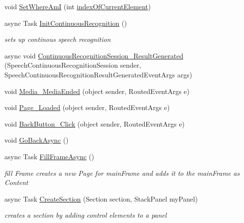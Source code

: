 \begin{DoxyCompactItemize}
void \mbox{\hyperlink{class_listen_to_me_1_1_main_page_ad9bc9fb81f3bfa4ccdee54d0f36503f1}{Set\+Where\+AmI}} (int \mbox{\hyperlink{class_listen_to_me_1_1_main_page_acc0f3cb24ff26c2cfc76cd42a2fe2118}{index\+Of\+Current\+Element}})
\item 
async Task \mbox{\hyperlink{class_listen_to_me_1_1_main_page_adbf1a6a0cab368d6e803bbd1b918a045}{Init\+Continuous\+Recognition}} ()
\begin{DoxyCompactList}\small\item\em sets up continous speech recognition \end{DoxyCompactList}\item 
async void \mbox{\hyperlink{class_listen_to_me_1_1_main_page_afad060c55f3bedc7d8e499829e133c98}{Continuous\+Recognition\+Session\+\_\+\+Result\+Generated}} (Speech\+Continuous\+Recognition\+Session sender, Speech\+Continuous\+Recognition\+Result\+Generated\+Event\+Args args)
\item 
void \mbox{\hyperlink{class_listen_to_me_1_1_main_page_ab7c9aeb7a6b1053375754c58933360d6}{Media\+\_\+\+Media\+Ended}} (object sender, Routed\+Event\+Args e)
\item 
void \mbox{\hyperlink{class_listen_to_me_1_1_main_page_a9e7a645ae278f0e83ff9c3a831b37028}{Page\+\_\+\+Loaded}} (object sender, Routed\+Event\+Args e)
\item 
void \mbox{\hyperlink{class_listen_to_me_1_1_main_page_abf609ebc2f3561a5031ede871d605f4e}{Back\+Button\+\_\+\+Click}} (object sender, Routed\+Event\+Args e)
\item 
void \mbox{\hyperlink{class_listen_to_me_1_1_main_page_a1c903daffe2e54a7e05a983a3831b973}{Go\+Back\+Async}} ()
\item 
async Task \mbox{\hyperlink{class_listen_to_me_1_1_main_page_aa8407277b978652a0e0ff80038bd443a}{Fill\+Frame\+Async}} ()
\begin{DoxyCompactList}\small\item\em fill Frame creates a new Page for main\+Frame and adds it to the main\+Frame as Content \end{DoxyCompactList}\item 
async Task \mbox{\hyperlink{class_listen_to_me_1_1_main_page_a383d3107e02c41689a1c4602467724f7}{Create\+Section}} (Section section, Stack\+Panel my\+Panel)
\begin{DoxyCompactList}\small\item\em creates a section by adding control elements to a panel \end{DoxyCompactList}\item 

\end{DoxyCompactItemize}
